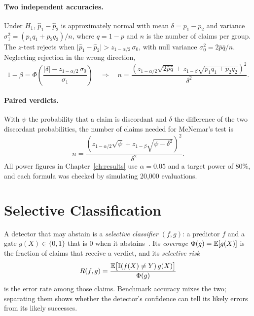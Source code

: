 \paragraph{Two independent accuracies.} Under $H_1$, $\hat{p}_1 - \hat{p}_2$ is approximately normal with mean $\delta = p_1 - p_2$ and variance $\sigma_1^2 = (p_1 q_1 + p_2 q_2)/n$, where $q = 1 - p$ and $n$ is the number of claims per group. The $z$-test rejects when $\lvert \hat{p}_1 - \hat{p}_2 \rvert > z_{1-\alpha/2}\,\sigma_0$, with null variance $\sigma_0^2 = 2\bar{p}\bar{q}/n$. Neglecting rejection in the wrong direction,
\begin{equation}
  1 - \beta = \Phi\!\left( \frac{\lvert \delta \rvert - z_{1-\alpha/2}\,\sigma_0}{\sigma_1} \right)
  \quad\Longrightarrow\quad
  n = \frac{\left( z_{1-\alpha/2}\sqrt{2\bar{p}\bar{q}} + z_{1-\beta}\sqrt{p_1 q_1 + p_2 q_2} \right)^2}{\delta^2}.
\end{equation}

\paragraph{Paired verdicts.} With $\psi$ the probability that a claim is discordant and $\delta$ the difference of the two discordant probabilities, the number of claims needed for McNemar's test is~\citep{connor1987sample}
\begin{equation}
  n = \frac{\left( z_{1-\alpha/2}\sqrt{\psi} + z_{1-\beta}\sqrt{\psi - \delta^2} \right)^2}{\delta^2}.
\end{equation}
All power figures in Chapter~\ref{ch:results} use $\alpha = 0.05$ and a target power of 80\%, and each formula was checked by simulating 20{,}000 evaluations.

\section{Selective Classification}
\label{sec:selective}

A detector that may abstain is a \emph{selective classifier} $(f, g)$: a predictor $f$ and a gate $g(X) \in \{0, 1\}$ that is 0 when it abstains~\citep{elyaniv2010foundations}. Its \emph{coverage} $\Phi(g) = \mathbb{E}[g(X)]$ is the fraction of claims that receive a verdict, and its \emph{selective risk}
\begin{equation}
  R(f, g) = \frac{\mathbb{E}\bigl[ \mathbb{I}(f(X) \ne Y)\, g(X) \bigr]}{\Phi(g)}
\end{equation}
is the error rate among those claims. Benchmark accuracy mixes the two; separating them shows whether the detector's confidence can tell its likely errors from its likely successes.

